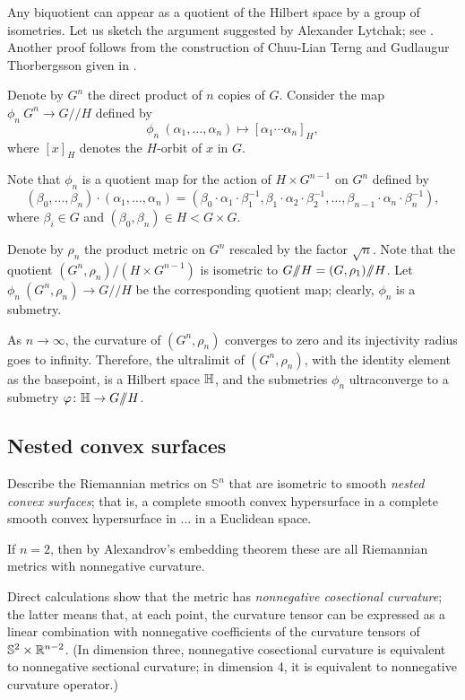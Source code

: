 Any biquotient can appear as a quotient of the Hilbert space by a group of isometries.
Let us sketch the argument suggested by Alexander Lytchak; see \cite{lebedeva-petrunin-zolotov}.
Another proof follows from the construction of Chuu-Lian Terng and Gudlaugur Thorbergsson given in \cite[Section 4]{terng-thorbergsson}.

Denote by $G^n$ the direct product of $n$ copies of $G$.
Consider the map $\phi_n\:G^n\to G/\!\!/H$ defined by
\[\phi_n\:(\alpha_1,\dots,\alpha_n)\mapsto [\alpha_1\cdots\alpha_n]_H,\]
where $[x]_H$ denotes the $H$-orbit of $x$ in $G$.

Note that $\phi_n$ is a quotient map for the action of $H\times G^{n-1}$ on $G^n$ defined by
\[(\beta_0,\dots,\beta_n)\cdot(\alpha_1,\dots,\alpha_n)
=
(\beta_0\cdot \alpha_1\cdot\beta_1^{-1},\beta_1\cdot\alpha_2\cdot\beta_2^{-1},\dots,\beta_{n-1}\cdot\alpha_n\cdot\beta_n^{-1}),\]
where $\beta_i\in G$ and $(\beta_0,\beta_n)\in H<G\times G$.

Denote by $\rho_n$ the product metric on $G^n$ rescaled by the factor $\sqrt{n}$.
Note that the quotient $(G^n,\rho_n)/(H\times G^{n-1})$ is isometric to $G/\!\!/H\z=(G,\rho_1)/\!\!/H$.
Let $\phi_n\:(G^n,\rho_n)\to G/\!\!/H$ be the corresponding quotient map;
clearly, $\phi_n$ is a submetry.

As $n\to\infty$, the curvature of $(G^n,\rho_n)$ converges to zero and its injectivity radius goes to infinity.
Therefore, the ultralimit of $(G^n,\rho_n)$, with the identity element as the basepoint, is a Hilbert space $\mathbb{H}$, and the submetries $\phi_n$ ultraconverge to a submetry $\varphi\colon\mathbb{H}\to G/\!\!/H$.

\subsection{Nested convex surfaces}

\begin{pr}
Describe the Riemannian metrics on $\mathbb{S}^n$ that are isometric to smooth \emph{nested convex surfaces};
that is, a complete smooth convex hypersurface
in a complete smooth convex hypersurface
in ...
in a Euclidean space.
\end{pr}

If $n=2$, then by Alexandrov's embedding theorem these are all Riemannian metrics with nonnegative curvature.

Direct calculations show that the metric has \emph{nonnegative cosectional curvature};
the latter means that, at each point, the curvature tensor can be expressed as a linear combination with nonnegative coefficients of the curvature tensors of $\mathbb{S}^2\times \mathbb{R}^{n-2}$.
(In dimension three, nonnegative cosectional curvature is equivalent
to nonnegative sectional curvature; in dimension 4, it is equivalent to nonnegative curvature operator.)

